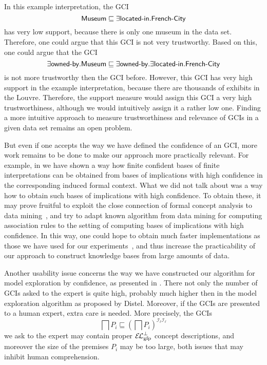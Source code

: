 In this example interpretation, the GCI
\begin{equation*}
  \mathsf{Museum} \sqsubseteq \exists \text{\textsf{located-in}}. \text{\textsf{French-City}}
\end{equation*}
has very low support, because there is only one museum in the data set.  Therefore, one
could argue that this GCI is not very trustworthy.  Based on this, one could argue that
the GCI
\begin{equation*}
  \exists \text{\textsf{owned-by}}. \mathsf{Museum} \sqsubseteq \exists
  \text{\textsf{owned-by}}. \exists \text{\textsf{located-in}}. \text{\textsf{French-City}}
\end{equation*}
is not more trustworthy then the GCI before.  However, this GCI has very high support in
the example interpretation, because there are thousands of exhibits in the Louvre.
Therefore, the support measure would assign this GCI a very high trustworthiness, although
we would intuitively assign it a rather low one.  Finding a more intuitive approach to
measure trustworthiness and relevance of GCIs in a given data set remains an open problem.

But even if one accepts the way we have defined the confidence of an GCI, more work
remains to be done to make our approach more practically relevant.  For example, in
 we have shown a
way how finite confident bases of finite interpretations can be obtained from bases of
implications with high confidence in the corresponding induced formal context.  What we
did not talk about was a way how to obtain such bases of implications with high
confidence.  To obtain these, it may prove fruitful to exploit the close connection of
formal concept analysis to data mining~\cite{arules:Zaki:1998}, and try to adapt known
algorithm from data mining for computing association rules to the setting of computing
bases of implications with high confidence.  In this way, one could hope to obtain much
faster implementations as those we have used for our
experiments~\cite{DBLP:conf/icdm/BorchmannD11}, and thus increase the practicability of
our approach to construct knowledge bases from large amounts of data.

Another usability issue concerns the way we have constructed our algorithm for model
exploration by confidence, as presented in .  There not only
the number of GCIs asked to the expert is quite high, probably much higher then in the
model exploration algorithm as proposed by Distel.  Moreover, if the GCIs are presented to
a human expert, extra care is needed.  More precisely, the GCIs
\begin{equation*}
  \bigsqcap P_{i} \sqsubseteq (\bigsqcap P_{i})^{\mathcal{I}_{\ell}\mathcal{I}_{\ell}}
\end{equation*}
we ask to the expert may contain proper ${{\mathcal{E}\kern-.3ex\mathcal{L}}_\text{gfp}^\bot}$ concept descriptions, and moreover the
size of the premises $P_{i}$ may be too large, both issues that may inhibit human
comprehension.

